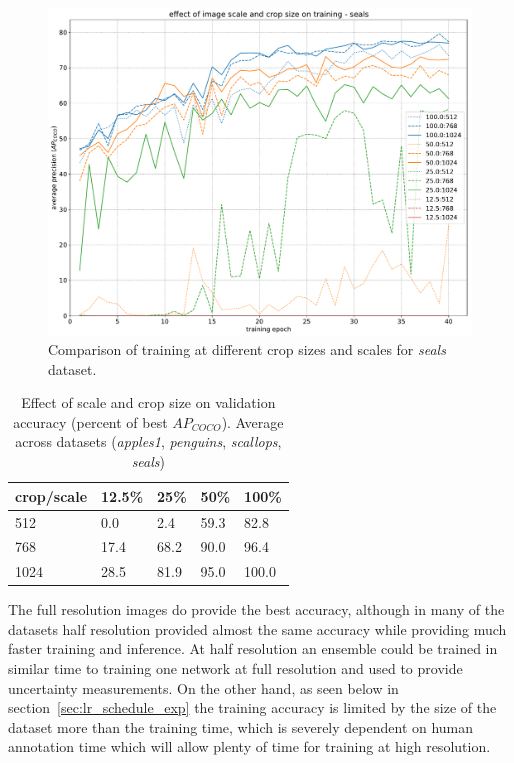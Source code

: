  
\begin{figure}[h]
  \centering
  \includegraphics[width=1.0\linewidth]{charts/training/crops_scales/seals.pdf}
  \caption{Comparison of training at different crop sizes and scales for \emph{seals} dataset. }  
  \label{fig:seals_crop_scale}
\end{figure}


\begin{table}[ht]
  \centering
    \caption{Effect of scale and crop size on validation accuracy (percent of best $AP_{COCO}$). Average across datasets (\emph{apples1}, \emph{penguins}, \emph{scallops}, \emph{seals}) }

  \begin{tabular}{ l | l l l l}
    crop/scale & 12.5\% & 25\% & 50\% & 100\% \\
    \toprule
        512   & 0.0  & 2.4  &  59.3  & 82.8 \\
        768   & 17.4 & 68.2  &  90.0 &  96.4 \\
        1024  & 28.5 & 81.9  &  95.0  & 100.0 \\
    \bottomrule
  \end{tabular}
\label{fig:accuracy_scale_crop}
\end{table}


The full resolution images do provide the best accuracy, although in many of the datasets half resolution provided almost the same accuracy while providing much faster training and inference. At half resolution an ensemble could be trained in similar time to training one network at full resolution and used to provide uncertainty measurements. On the other hand, as seen below in section~\ref{sec:lr_schedule_exp} the training accuracy is limited by the size of the dataset more than the training time, which is severely dependent on human annotation time which will allow plenty of time for training at high resolution.

